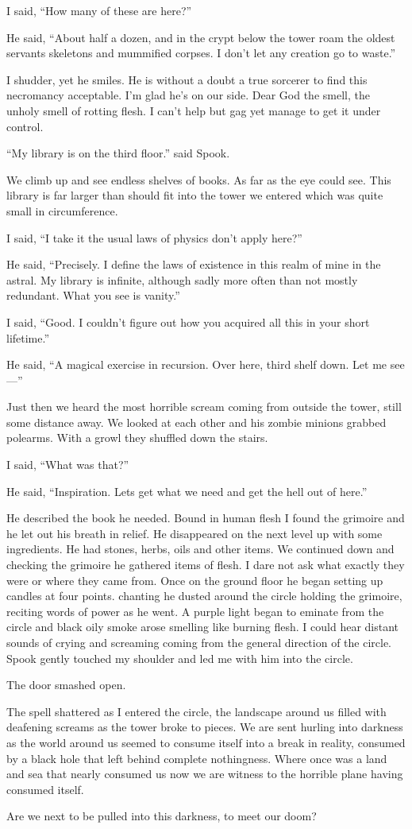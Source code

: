 I said, ``How many of these are here?''

He said, ``About half a dozen, and in the crypt below the tower roam the oldest servants skeletons and mummified corpses. I don't let any creation go to waste.''

I shudder, yet he smiles. He is without a doubt a true sorcerer to find this necromancy acceptable. I'm glad he's on our side. Dear God the smell, the unholy smell of rotting flesh. I can't help but gag yet manage to get it under control.

``My library is on the third floor.'' said Spook.

We climb up and see endless shelves of books. As far as the eye could see. This library is far larger than should fit into the tower we entered which was quite small in circumference.

I said, ``I take it the usual laws of physics don't apply here?''

He said, ``Precisely. I define the laws of existence in this realm of mine in the astral. My library is infinite, although sadly more often than not mostly redundant. What you see is vanity.''

I said, ``Good. I couldn't figure out how you acquired all this in your short lifetime.''

He said, ``A magical exercise in recursion. Over here, third shelf down. Let me see---''

Just then we heard the most horrible scream coming from outside the tower, still some distance away. We looked at each other and his zombie minions grabbed polearms. With a growl they shuffled down the stairs.

I said, ``What was that?''

He said, ``Inspiration. Lets get what we need and get the hell out of here.''

He described the book he needed. Bound in human flesh I found the grimoire and he let out his breath in relief. He disappeared on the next level up with some ingredients. He had stones, herbs, oils and other items. We continued down and checking the grimoire he gathered items of flesh. I dare not ask what exactly they were or where they came from. Once on the ground floor he began setting up candles at four points. chanting he dusted around the circle holding the grimoire, reciting words of power as he went. A purple light began to eminate from the circle and black oily smoke arose smelling like burning flesh. I could hear distant sounds of crying and screaming coming from the general direction of the circle. Spook gently touched my shoulder and led me with him into the circle.

The door smashed open.

The spell shattered as I entered the circle, the landscape around us filled with deafening screams as the tower broke to pieces. We are sent hurling into darkness as the world around us seemed to consume itself into a break in reality, consumed by a black hole that left behind complete nothingness. Where once was a land and sea that nearly consumed us now we are witness to the horrible plane having consumed itself.

Are we next to be pulled into this darkness, to meet our doom?

